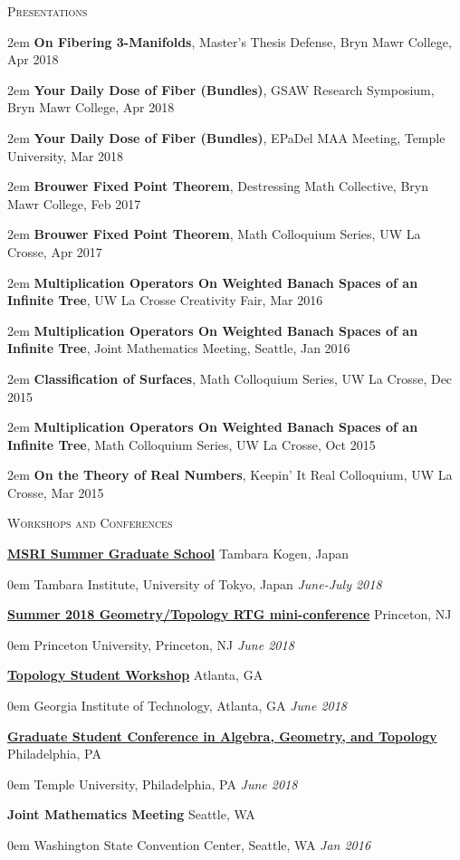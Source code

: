 \documentclass[11pt]{article}
\newenvironment{headitem}[2]{\hspace{.5em} \textbf{#1} \hfill #2 \begin{addmargin}[0em]{0em}}{\end{addmargin}}
\renewenvironment{section}[1]{\textsc{\large #1} \vskip5pt}{\vskip10pt}
\newcommand{\itemreg}[1]{\begin{addmargin}[.75em]{2em} #1 \end{addmargin}}
\newcommand{\itemdate}[2]{\hspace{.5em} #1 \hfill \textit{#2} \\}
\begin{document}
\begin{section}{Presentations}
	\itemreg{\textbf{On Fibering 3-Manifolds}, Master's Thesis Defense, Bryn Mawr College, Apr 2018} \vskip2pt
	\itemreg{\textbf{Your Daily Dose of Fiber (Bundles)}, GSAW Research Symposium, Bryn Mawr College, Apr 2018} \vskip2pt
	\itemreg{\textbf{Your Daily Dose of Fiber (Bundles)}, EPaDel MAA Meeting, Temple University, Mar 2018} \vskip2pt
	\itemreg{\textbf{Brouwer Fixed Point Theorem}, Destressing Math Collective, Bryn Mawr College, Feb 2017} \vskip2pt
	\itemreg{\textbf{Brouwer Fixed Point Theorem}, Math Colloquium Series, UW La Crosse, Apr 2017} \vskip2pt
	\itemreg{\textbf{Multiplication Operators On Weighted Banach Spaces of an Infinite Tree}, UW La Crosse Creativity Fair, Mar 2016} \vskip2pt
	\itemreg{\textbf{Multiplication Operators On Weighted Banach Spaces of an Infinite Tree}, Joint Mathematics Meeting, Seattle, Jan 2016} \vskip2pt
	\itemreg{\textbf{Classification of Surfaces}, Math Colloquium Series, UW La Crosse, Dec 2015} \vskip2pt
	\itemreg{\textbf{Multiplication Operators On Weighted Banach Spaces of an Infinite Tree}, Math Colloquium Series, UW La Crosse, Oct 2015} \vskip2pt
	\itemreg{\textbf{On the Theory of Real Numbers}, Keepin' It Real Colloquium, UW La Crosse, Mar 2015} 
\end{section}



\begin{section}{Workshops and Conferences}

	\begin{headitem}{\href{http://www.msri.org/web/msri/scientific/workshops/summer-graduate-school}{MSRI Summer Graduate School}}{Tambara Kogen, Japan}
		\itemdate{Tambara Institute, University of Tokyo, Japan}{June-July 2018}
	\end{headitem}
	\vskip5pt
	
	\begin{headitem}{\href{https://web.math.princeton.edu/~petero/RTG/MiniConf1.html}{Summer 2018 Geometry/Topology RTG mini-conference}}{Princeton, NJ}
		\itemdate{Princeton University, Princeton, NJ}{June 2018}
	\end{headitem}
	\vskip5pt	
	
	\begin{headitem}{\href{http://people.math.gatech.edu/~dmargalit7/tsw18/index.shtml}{Topology Student Workshop}}{Atlanta, GA}
		\itemdate{Georgia Institute of Technology, Atlanta, GA}{June 2018}
	\end{headitem}
	\vskip5pt
	
	\begin{headitem}{\href{https://math.temple.edu/events/conferences/gscagt/}{Graduate Student Conference in Algebra, Geometry, and Topology}}{Philadelphia, PA}
		\itemdate{Temple University, Philadelphia, PA}{June 2018}
	\end{headitem}
	\vskip5pt

	\begin{headitem}{Joint Mathematics Meeting}{Seattle, WA}
		\itemdate{Washington State Convention Center, Seattle, WA}{Jan 2016}
	\end{headitem}

\end{section}
\end{document}
